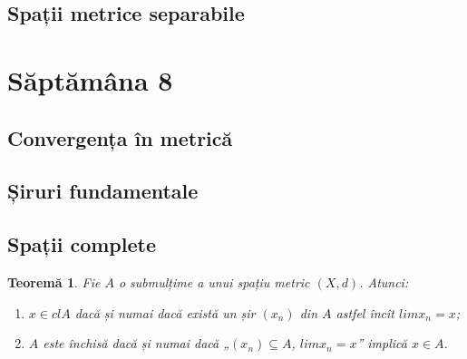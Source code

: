 \documentclass[a4paper,12pt]{article}
\theoremstyle{change}
\newtheorem{theorem}{Teoremă}[section]
\begin{document}
\subsection{Spații metrice separabile}

\section{Săptămâna 8}


\subsection{Convergența în metrică}

\subsection{Șiruri fundamentale}


\subsection{Spații complete}

\begin{theorem}
Fie $A$ o submulțime a unui spațiu metric $(X,d)$. Atunci:
\begin{enumerate}
\item $x\in cl A$ dacă și numai dacă există un șir $(x_n)$ din $A$ astfel încît $lim x_n = x$;
\item $A$ este închisă dacă și numai dacă „$(x_n)\subseteq A$, $lim x_n = x$” implică $x\in A$.
\end{enumerate}
\end{theorem}
\end{document}
